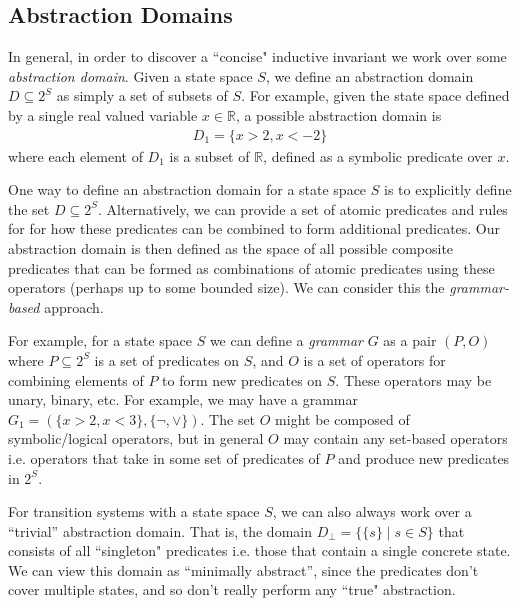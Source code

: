 \documentclass[10pt]{article}
\begin{document}
\subsection*{Abstraction Domains}

In general, in order to  discover a ``concise" inductive invariant we work over some \textit{abstraction domain}. Given a state space $S$, we define an abstraction domain $D \subseteq 2^S$ as simply a set of subsets of $S$. For example, given the state space defined by a single real valued variable $x \in \mathbb{R}$, a possible abstraction domain is
\begin{align*}
    D_1 = \{x > 2, x < - 2\}
\end{align*} 
where each element of $D_1$ is a subset of $\mathbb{R}$, defined as a symbolic predicate over $x$.

One way to define an abstraction domain for a state space $S$ is to explicitly define the set $D \subseteq 2^S$. Alternatively, we can provide a set of atomic predicates and rules for for how these predicates can be combined to form additional predicates. Our abstraction domain is then defined as the space of all possible composite predicates that can be formed as combinations of atomic predicates using these operators (perhaps up to some bounded size). We can consider this the \textit{grammar-based} approach.

For example, for a state space $S$ we can define a \textit{grammar} $G$ as a pair $(P,O)$ where $P \subseteq 2^S$ is a set of predicates on $S$, and $O$ is a set of operators for combining elements of $P$ to form new predicates on $S$. These operators may be unary, binary, etc. For example, we may have a grammar $G_1 = (\{x>2, x < 3\}, \{\neg, \vee\})$. The set $O$ might be composed of symbolic/logical operators, but in general $O$ may contain any set-based operators i.e. operators that take in some set of predicates of $P$ and produce new predicates in $2^S$.


For transition systems with a state space $S$, we can also always work over a ``trivial'' abstraction domain. That is, the domain $D_{\bot} = \{\{s\} \mid s \in S\}$ that consists of all ``singleton" predicates i.e. those that contain a single concrete state. We can view this domain as ``minimally abstract'', since the predicates don't cover multiple states, and so don't really perform any ``true" abstraction.
\end{document}
